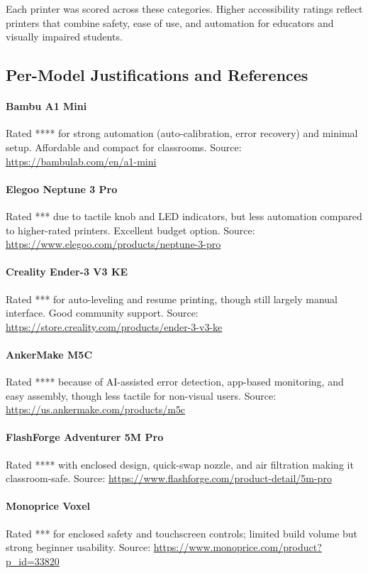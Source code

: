 Each printer was scored across these categories. Higher accessibility ratings reflect printers that combine safety, ease of use, and automation for educators and visually impaired students.

\subsection*{Per-Model Justifications and References}

\paragraph{Bambu A1 Mini}  
Rated **** for strong automation (auto-calibration, error recovery) and minimal setup. Affordable and compact for classrooms.  
Source: \url{https://bambulab.com/en/a1-mini}

\paragraph{Elegoo Neptune 3 Pro}  
Rated *** due to tactile knob and LED indicators, but less automation compared to higher-rated printers. Excellent budget option.  
Source: \url{https://www.elegoo.com/products/neptune-3-pro}

\paragraph{Creality Ender-3 V3 KE}  
Rated *** for auto-leveling and resume printing, though still largely manual interface. Good community support.  
Source: \url{https://store.creality.com/products/ender-3-v3-ke}

\paragraph{AnkerMake M5C}  
Rated **** because of AI-assisted error detection, app-based monitoring, and easy assembly, though less tactile for non-visual users.  
Source: \url{https://us.ankermake.com/products/m5c}

\paragraph{FlashForge Adventurer 5M Pro}  
Rated **** with enclosed design, quick-swap nozzle, and air filtration making it classroom-safe.  
Source: \url{https://www.flashforge.com/product-detail/5m-pro}

\paragraph{Monoprice Voxel}  
Rated *** for enclosed safety and touchscreen controls; limited build volume but strong beginner usability.  
Source: \url{https://www.monoprice.com/product?p_id=33820}

